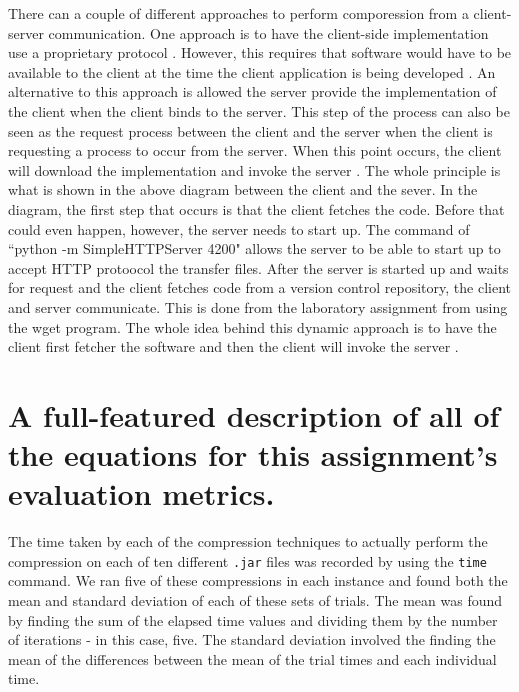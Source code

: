\documentclass{article}
\begin{document}
There can a couple of different approaches to perform comporession from a client-server communication. One approach is to have the client-side implementation use a proprietary protocol \cite{tanenbaum_steen_2007}. However, this requires that software would have to be available to the client at the time the client application is being developed \cite{tanenbaum_steen_2007}. An alternative to this approach is allowed the server provide the implementation of the client when the client binds to the server. This step of the process can also be seen as the request process between the client and the server when the client is requesting a process to occur from the server. When this point occurs, the client will download the implementation and invoke the server \cite{tanenbaum_steen_2007}. The whole principle is what is shown in the above diagram between the client and the sever. In the diagram, the first step that occurs is that the client fetches the code. Before that could even happen, however, the server needs to start up. The command of ``python -m SimpleHTTPServer 4200" allows the server to be able to start up to accept HTTP protoocol the transfer files. After the server is started up and waits for request and the client fetches code from a version control repository, the client and server communicate. This is done from the laboratory assignment from using the wget program. The whole idea behind this dynamic approach is to have the client first fetcher the software and then the client will invoke the server \cite{tanenbaum_steen_2007}.

\section{A full-featured description of all of the equations for this assignment’s evaluation metrics.}

The time taken by each of the compression techniques to actually perform the compression on each of ten different \texttt{.jar} files was recorded by using the \texttt{time} command. We ran five of these compressions in each instance and found both the mean and standard deviation of each of these sets of trials. The mean was found by finding the sum of the elapsed time values and dividing them by the number of iterations - in this case, five. The standard deviation involved the finding the mean of the differences between the mean of the trial times and each individual time. 
\end{document}
